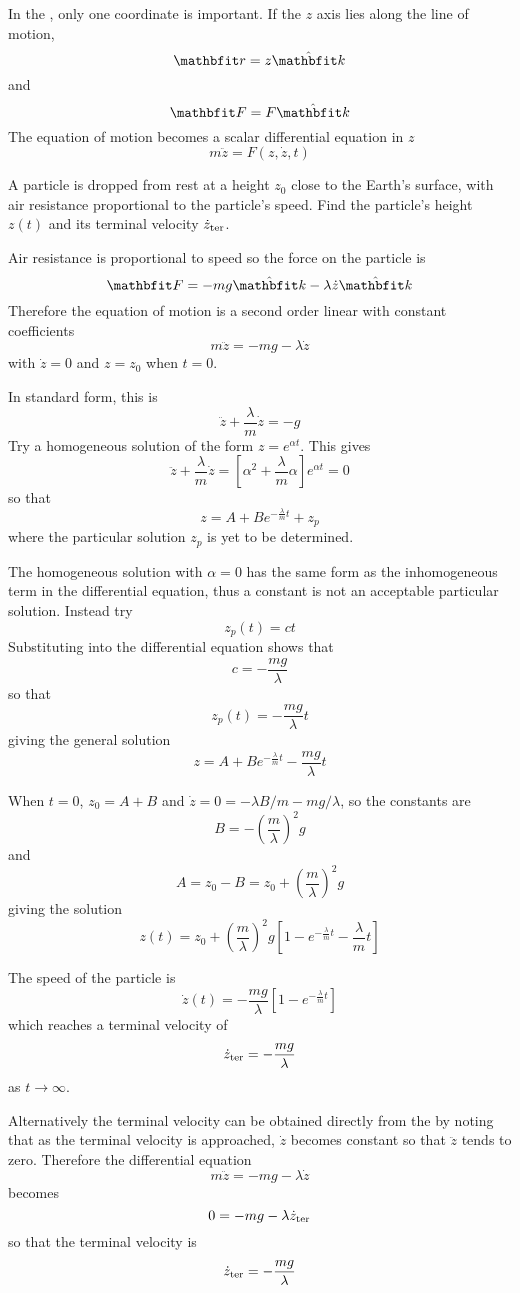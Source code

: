 In the , only one coordinate is important.
If the $z$ axis lies along the line of motion,
$$\vect{r}=z\kvect$$
and
$$\vect{F}=F\kvect$$
The equation of motion becomes a scalar differential equation in $z$
$$m\ddot{z}=F(z,\dot{z},t)$$

\begin{example}
\label{spd ex:dropped}

\problem A particle is dropped from rest at a height $z_0$ close to the
Earth's surface, with air resistance proportional to the particle's speed.
Find the particle's height $z(t)$ and its terminal velocity 
$\dot{z}_{\rm ter}$.

\solution
Air resistance is proportional to speed so the force on the particle is
$$\vect{F}=-mg\kvect-\lambda\dot{z}\kvect$$
Therefore the equation of motion is a second order linear \ODE with 
constant coefficients
$$m\ddot{z}=-mg-\lambda\dot{z}$$
with $\dot{z}=0$ and $z=z_0$ when $t=0$.

In standard form, this is
$$\ddot{z}+\frac{\lambda}{m}\dot{z}=-g$$
Try a homogeneous solution of the form $z=e^{\alpha t}$.  This gives
$$\ddot{z}+\frac{\lambda}{m}\dot{z}
=\left[\alpha^2+\frac{\lambda}{m}\alpha\right]e^{\alpha t}=0$$
so that
$$z=A+Be^{-\frac{\lambda}{m}t}+z_p$$
where the particular solution $z_p$ is yet to be determined.

The homogeneous solution with $\alpha=0$ has the same form as the
inhomogeneous term in the differential equation, thus a constant is not an
acceptable particular solution.  Instead try
$$z_p(t)=ct$$
Substituting into the differential equation shows that
$$c=-\frac{mg}{\lambda}$$
so that 
$$z_p(t)=-\frac{mg}{\lambda}t$$
giving the general solution
$$z=A+Be^{-\frac{\lambda}{m}t}-\frac{mg}{\lambda}t$$

When $t=0$, $z_0=A+B$ and $\dot{z}=0=-\lambda B/m-mg/\lambda$,
so the constants are
$$B=-\left(\frac{m}{\lambda}\right)^2g$$
and
$$A=z_0-B=z_0+\left(\frac{m}{\lambda}\right)^2g$$
giving the solution
$$z(t)=z_0+\left(\frac{m}{\lambda}\right)^2g\left[
1-e^{-\frac{\lambda}{m}t}-\frac{\lambda}{m}t\right]$$

The speed of the particle is
$$\dot{z}(t)=-\frac{mg}{\lambda}\left[1-e^{-\frac{\lambda}{m}t}\right]$$
which reaches a terminal velocity of 
$$\dot{z}_{\rm ter}=-\frac{mg}{\lambda}$$
as $t\to\infty$.

\parbreak Alternatively the terminal velocity can be obtained directly 
from the \ODE by noting
that as the terminal velocity is approached, $\dot{z}$ becomes constant so
that $\ddot{z}$ tends to zero.  Therefore the differential equation
$$m\ddot{z}=-mg-\lambda\dot{z}$$
becomes
$$0=-mg-\lambda\dot{z}_{\rm ter}$$
so that the terminal velocity is
$$\dot{z}_{\rm ter}=-\frac{mg}{\lambda}$$


\end{example}
